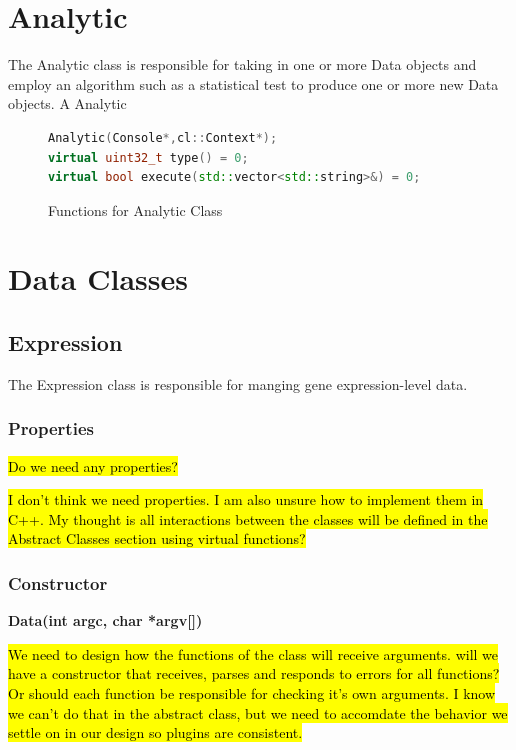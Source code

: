 \documentclass[10pt]{article}
\providecommand{\stephen}[1]{\sethlcolor{lyellow}\hl{#1}}
\providecommand{\josh}[1]{\sethlcolor{lblue}\hl{#1}}
\begin{document}
\newpage
\section{Analytic}

The Analytic class is responsible for taking in one or more Data objects
and employ an algorithm such as a statistical test to produce one or more 
new Data objects.   A Analytic 

\begin{figure}[H]
\begin{mdframed}[style=functions]
\begin{lstlisting}[language=C++]
Analytic(Console*,cl::Context*);
virtual uint32_t type() = 0;
virtual bool execute(std::vector<std::string>&) = 0;
\end{lstlisting}
\end{mdframed}
\caption{Functions for Analytic Class}
\label{fig:kincanalytic}
\end{figure}

\newpage
\section{Data Classes}

\subsection{Expression}

The Expression class is responsible for manging gene expression-level data.  

\subsubsection{Properties}

\stephen{Do we need any properties?}

\josh{I don't think we need properties. I am also unsure how to implement them 
in C++. My thought is all interactions between the classes will be defined in 
the Abstract Classes section using virtual functions?}

\subsubsection{Constructor}

{\bfseries Data(int argc, char *argv[])}

\stephen{We need to design how the functions of the class will receive 
arguments.  will we have a constructor that receives, parses and responds to 
errors for all functions?  Or should each function be responsible for checking 
it's own arguments. I know we can't do that in the abstract class, but 
we need to accomdate the behavior we settle on in our design so plugins
are consistent.}
\end{document}
